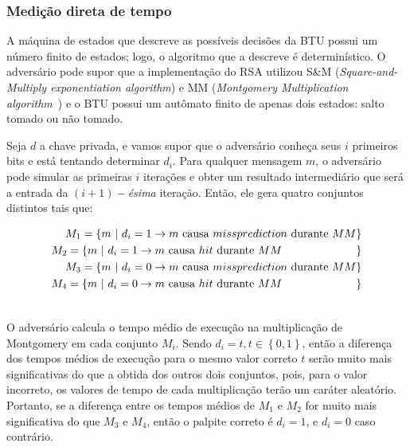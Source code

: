 \documentclass{SBCbookchapter}
\begin{document}
\subsubsection{Medi\c{c}\~{a}o direta de tempo}

A m\'{a}quina de estados que descreve as poss\'{i}veis decis\~{o}es da BTU possui um n\'{u}mero finito de estados; logo, o algoritmo que a descreve \'{e} determin\'{i}stico. O advers\'{a}rio pode supor que a implementa\c{c}\~{a}o do RSA utilizou S\&M (\textit{Square-and-Multiply exponentiation algorithm}) e MM (\textit{Montgomery Multiplication algorithm}~\cite{ECCBook_HankersonVanstone2004, 1197338}) e o BTU possui um aut\^{o}mato finito de apenas dois estados: salto tomado ou n\~{a}o tomado.

Seja $d$ a chave privada, e vamos supor que o advers\'{a}rio conheça seus $i$ primeiros bits e est\'{a} tentando determinar $d_{i}$. Para qualquer mensagem $m$, o advers\'{a}rio pode simular as primeiras $i$ itera\c{c}\~{o}es e obter um resultado intermedi\'{a}rio que ser\'{a} a entrada da $(i+1)-$\textit{\'{e}sima} itera\c{c}\~{a}o. Ent\~{a}o, ele gera quatro conjuntos distintos tais que:

\begin{align} \notag
	M_{1} = \left\lbrace m\ \vert\ d_{i} = 1 \rightarrow m\ \mbox{causa}\ missprediction\ \mbox{durante}\ MM\right\rbrace \\ \notag
	M_{2} = \left\lbrace m\ \vert\ d_{i} = 1 \rightarrow m\ \mbox{causa}\ hit\ \mbox{durante}\ MM\ \ \ \ \ \ \ \ \ \ \ \ \ \ \ \ \ \ \ \ \right\rbrace \\ \notag
	M_{3} = \left\lbrace m\ \vert\ d_{i} = 0 \rightarrow m\ \mbox{causa}\ missprediction\ \mbox{durante}\ MM\right\rbrace \\ \notag
	M_{4} = \left\lbrace m\ \vert\ d_{i} = 0 \rightarrow m\ \mbox{causa}\ hit\ \mbox{durante}\ MM\ \ \ \ \ \ \ \ \ \ \ \ \ \ \ \ \ \ \ \ \right\rbrace \\ \notag
\end{align}

O advers\'{a}rio calcula o tempo m\'{e}dio de execu\c{c}\~{a}o na multiplica\c{c}\~{a}o de Montgomery em cada conjunto $M_{i}$. Sendo $d_{i} = t, t \in \left\lbrace 0,1\right\rbrace $, então a diferen\c{c}a dos tempos m\'{e}dios de execu\c{c}\~{a}o para o mesmo valor correto $t$ ser\~{a}o muito mais significativas do que a obtida dos outros dois conjuntos, pois, para o valor incorreto, os valores de tempo de cada multiplica\c{c}\~{a}o ter\~{a}o um caráter aleat\'{o}rio. Portanto, se a diferen\c{c}a entre os tempos m\'{e}dios de $M_{1}$ e $M_{2}$ for muito mais significativa do que $M_{3}$ e $M_{4}$, ent\~{a}o o palpite correto \'{e} $d_{i} = 1$, e $d_{i} = 0$ caso contr\'{a}rio. 
\end{document}
